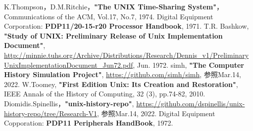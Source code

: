 \begin{thebibliography}{99}
\small
\setlength\itemsep{-0.5\zh}%
 K.Thompson，D.M.Ritchie，\textbf{"The UNIX Time-Sharing System"}，Communications of the ACM, Vol.17, No.7, 1974.
 Digital Equipment Corporation: \textbf{PDP11/20-15-r20 Processor Handbook}, 1971.
 T.R. Bashkow, \textbf{"Study of UNIX: Preliminary Release of Unix Implementation Document"}, \url{ http://minnie.tuhs.org/Archive/Distributions/Research/Dennis_v1/PreliminaryUnixImplementationDocument_Jun72.pdf}, Jun. 1972.
 simh, \textbf{"The Computer History Simulation Project"}, \url{https://github.com/simh/simh}, 参照Mar.14, 2022.
 W.Toomey, \textbf{"First Edition Unix: Its Creation and Restoration"}, IEEE Annals of the History of Computing, 32 (3), pp.74-82, 2010.
 Diomidis.Spinellis，\textbf{"unix-history-repo"},  \url{https://github.com/dspinellis/unix-history-repo/tree/Research-V1}, 参照Mar.14, 2022.
 Digital Equipment Copporation: \textbf{PDP11 Peripherals HandBook}, 1972.
\end{thebibliography}

 
